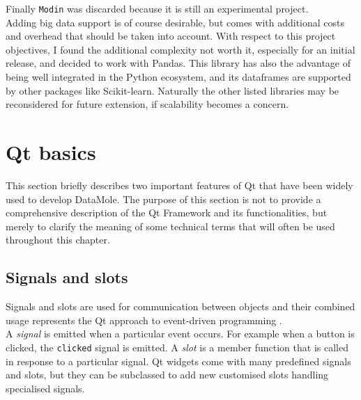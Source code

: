 Finally \texttt{Modin} was discarded because it is still an experimental project.\\
Adding big data support is of course desirable, but comes with additional costs and overhead that should be taken into account. With respect to this project objectives, I found the additional complexity not worth it, especially for an initial release, and decided to work with Pandas. This library has also the advantage of being well integrated in the Python ecosystem, and its dataframes are supported by other packages like Scikit-learn. Naturally the other listed libraries may be reconsidered for future extension, if scalability becomes a concern.

\section{Qt basics}
\label{ssec:qt-basics}
This section briefly describes two important features of Qt that have been widely used to develop DataMole. The purpose of this section is not to provide a comprehensive description of the Qt Framework and its functionalities, but merely to clarify the meaning of some technical terms that will often be used throughout this chapter.

\subsection{Signals and slots}
Signals and slots are used for communication between objects and their combined usage represents the Qt approach to event-driven programming \cite{site:qt-doc-signals}.\\
A \textit{signal} is emitted when a particular event occurs. For example when a button is clicked, the \texttt{clicked} signal is emitted. A \textit{slot} is a member function that is called in response to a particular signal. Qt widgets come with many predefined signals and slots, but they can be subclassed to add new customised slots handling specialised signals.

